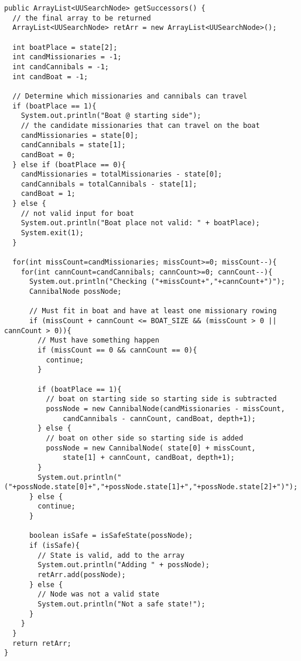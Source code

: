 \documentclass[a4paper]{report}
\begin{document}
\begin{lstlisting}
public ArrayList<UUSearchNode> getSuccessors() {
  // the final array to be returned
  ArrayList<UUSearchNode> retArr = new ArrayList<UUSearchNode>();
  
  int boatPlace = state[2];
  int candMissionaries = -1;
  int candCannibals = -1;
  int candBoat = -1;
  
  // Determine which missionaries and cannibals can travel
  if (boatPlace == 1){
    System.out.println("Boat @ starting side");
    // the candidate missionaries that can travel on the boat
    candMissionaries = state[0];
    candCannibals = state[1];
    candBoat = 0;
  } else if (boatPlace == 0){
    candMissionaries = totalMissionaries - state[0];
    candCannibals = totalCannibals - state[1];
    candBoat = 1;
  } else {
    // not valid input for boat
    System.out.println("Boat place not valid: " + boatPlace);
    System.exit(1);
  }
  
  for(int missCount=candMissionaries; missCount>=0; missCount--){
    for(int cannCount=candCannibals; cannCount>=0; cannCount--){
      System.out.println("Checking ("+missCount+","+cannCount+")");
      CannibalNode possNode;
      
      // Must fit in boat and have at least one missionary rowing
      if (missCount + cannCount <= BOAT_SIZE && (missCount > 0 || cannCount > 0)){
        // Must have something happen
        if (missCount == 0 && cannCount == 0){
          continue;
        }
        
        if (boatPlace == 1){
          // boat on starting side so starting side is subtracted
          possNode = new CannibalNode(candMissionaries - missCount, 
              candCannibals - cannCount, candBoat, depth+1);
        } else {
          // boat on other side so starting side is added
          possNode = new CannibalNode( state[0] + missCount, 
              state[1] + cannCount, candBoat, depth+1);
        }
        System.out.println("("+possNode.state[0]+","+possNode.state[1]+","+possNode.state[2]+")");
      } else {
        continue;
      }
      
      boolean isSafe = isSafeState(possNode);
      if (isSafe){
        // State is valid, add to the array
        System.out.println("Adding " + possNode);
        retArr.add(possNode);
      } else {
        // Node was not a valid state
        System.out.println("Not a safe state!");
      }
    }
  }
  return retArr;
}
\end{lstlisting}
\end{document}
